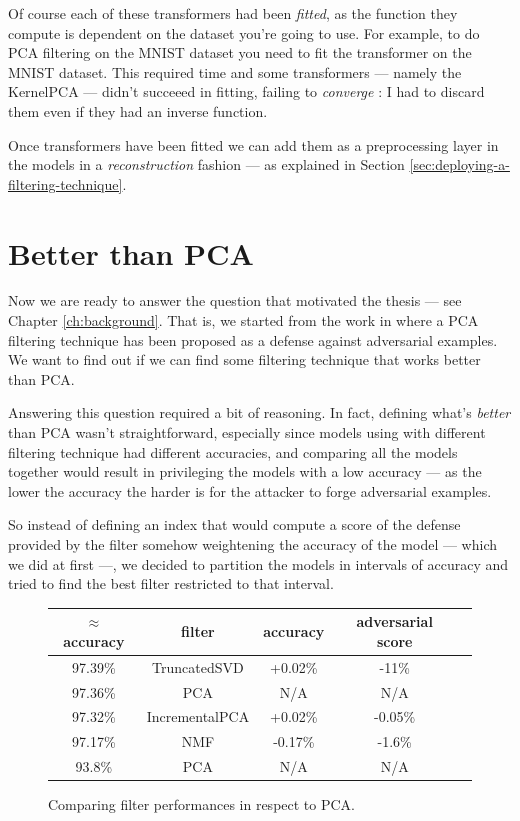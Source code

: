 Of course each of these transformers had been \emph{fitted}, as the
function they compute is dependent on the dataset you're going to use.
For example, to do PCA filtering on the MNIST dataset you need to fit
the transformer on the MNIST dataset. This required time and some
transformers --- namely the KernelPCA --- didn't succeeed in fitting,
failing to \emph{converge} : I had to discard them even if they had an
inverse function.

Once transformers have been fitted we can add them as a preprocessing
layer in the models in a \emph{reconstruction} fashion --- as explained
in Section \ref{sec:deploying-a-filtering-technique}.

\section{Better than PCA}
\label{sec:better-than-pca}

Now we are ready to answer the question that motivated the thesis ---
see Chapter \ref{ch:background}. That is, we started from the work in
\cite{bhagoji2018enhancing} where a PCA filtering technique has been
proposed as a defense against adversarial examples. We want to find out
if we can find some filtering technique that works better than PCA.

Answering this question required a bit of reasoning. In fact, defining
what's \emph{better} than PCA wasn't straightforward, especially since
models using with different filtering technique had different
accuracies, and comparing all the models together would result in
privileging the models with a low accuracy --- as the lower the
accuracy the harder is for the attacker to forge adversarial examples.

So instead of defining an index that would compute a score of the
defense provided by the filter somehow weightening the accuracy of the
model --- which we did at first ---, we decided to partition the models
in intervals of accuracy and tried to find the best filter restricted
to that interval.

\begin{figure}
  \centering
  \begin{tabular}{|c|c|c|c|c|}
    \hline
    $\approx$accuracy & filter & accuracy & adversarial score\\
    \hline
    \hline
    97.39\% & TruncatedSVD & +0.02\% & -11\% \\
    \hline
    97.36\% & PCA & N/A & N/A \\
    \hline
    97.32\% & IncrementalPCA & +0.02\% & -0.05\% \\
    \hline
    97.17\% & NMF & -0.17\% & -1.6\% \\
    \hline
    93.8\% & PCA & N/A & N/A \\
    \hline
  \end{tabular}
  \caption{Comparing filter performances in respect to PCA.}
  \label{fig:filters-comparison}
\end{figure}

